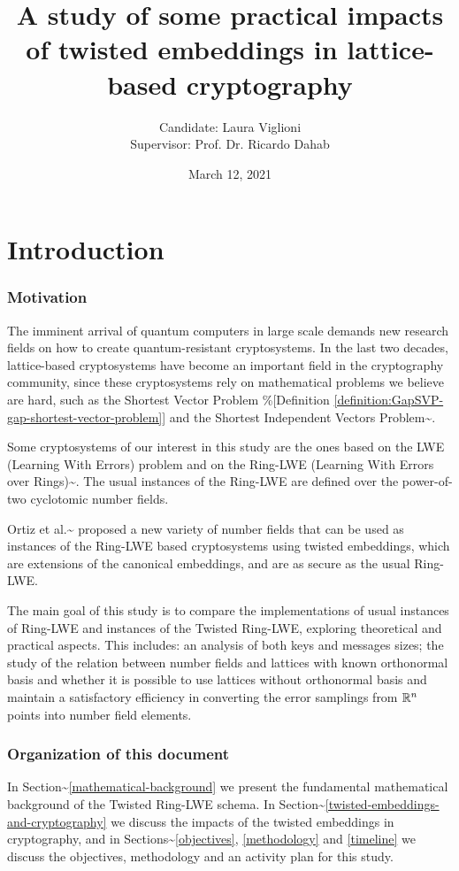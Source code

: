 \documentclass[a4paper,12pt]{article}
\author{Candidate: Laura Viglioni \\ Supervisor: Prof. Dr. Ricardo Dahab}
\date{March 12, 2021}
\title{A study of some practical impacts of twisted embeddings in lattice-based cryptography}
\begin{document}
\maketitle


\section{Introduction}
\label{sec:orgee88998}
\subsubsection*{Motivation}
\label{sec:org7456b3e}
The imminent arrival of quantum computers in large scale demands new research fields on how to create quantum-resistant cryptosystems. In the last two decades, lattice-based cryptosystems have become an important field in the cryptography community, since these cryptosystems rely on mathematical problems we believe are hard, such as the Shortest Vector Problem \%[Definition \ref{definition:GapSVP-gap-shortest-vector-problem}]
and the Shortest Independent Vectors Problem\textasciitilde{}\cite{Peikert2017}.

Some cryptosystems of our interest in this study are the ones based on the LWE (Learning With Errors) problem 
and on the Ring-LWE (Learning With Errors over Rings)\textasciitilde{}\cite{Regev2009}.
The usual instances of the Ring-LWE are defined over the power-of-two cyclotomic number fields.

Ortiz et al.\textasciitilde{}\cite{Ortiz2021} proposed a new variety of number fields that can be used as instances of the Ring-LWE based cryptosystems using twisted embeddings,  
which are extensions of the canonical embeddings, and are as secure as the usual Ring-LWE.

The main goal of this study is to compare the implementations of usual instances of Ring-LWE and instances of the Twisted Ring-LWE, 
exploring theoretical and practical aspects.
This  includes: an analysis of both keys and messages sizes; the study of the relation between number fields and lattices with known orthonormal basis and whether it is possible to use lattices without orthonormal basis and maintain a satisfactory efficiency in converting the error samplings from \(\mathbb{R}^n\) points into number field elements.

\subsubsection*{Organization of this document}
\label{sec:org11ef963}
In Section\textasciitilde{}\ref{mathematical-background}  we present the fundamental mathematical background of the Twisted Ring-LWE schema. In Section\textasciitilde{}\ref{twisted-embeddings-and-cryptography} we discuss the impacts of the twisted embeddings in cryptography, and in Sections\textasciitilde{}\ref{objectives},  \ref{methodology} and \ref{timeline}  we discuss the objectives, methodology and an activity plan for this study.
\end{document}
